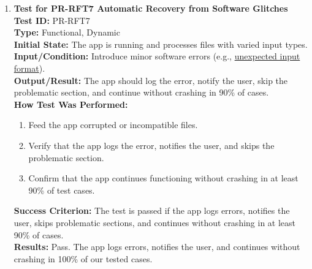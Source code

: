 \documentclass[12pt, titlepage]{article}
\begin{document}
\begin{enumerate}
    \item \textbf{Test for PR-RFT7 Automatic Recovery from Software Glitches} \\
      \newline
      \textbf{Test ID:} PR-RFT7 \\
      \textbf{Type:} Functional, Dynamic \\
      \textbf{Initial State:} The app is running and processes files with varied input types. \\
      \textbf{Input/Condition:} Introduce minor software errors (e.g., 
      \href{https://github.com/emilyperica/ScoreGen/tree/main/test/TestingDatasets/sample-formats}{unexpected input format}). \\
      \textbf{Output/Result:} The app should log the error, notify the user, skip the problematic section, and continue 
      without crashing in 90\% of cases. \\
      \textbf{How Test Was Performed:}
      \begin{enumerate}
          \item Feed the app corrupted or incompatible files.
          \item Verify that the app logs the error, notifies the user, and skips the problematic section.
          \item Confirm that the app continues functioning without crashing in at least 90\% of test cases.
      \end{enumerate}
      \textbf{Success Criterion:} The test is passed if the app logs errors, notifies the user, skips problematic sections, and continues
      without crashing in at least 90\% of cases.\\
      \textbf{Results:} Pass. The app logs errors, notifies the user, and continues without crashing in 100\% of our tested cases.\\


\end{enumerate}
\end{document}
